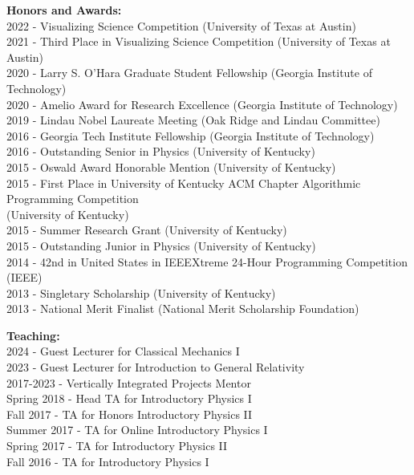 \documentclass[11pt]{article}
\begin{document}
\begin{flushleft}
  \textbf{Honors and Awards:}\\
  2022 - Visualizing Science Competition (University of Texas at Austin)\\
  2021 - Third Place in Visualizing Science Competition (University of Texas at Austin)\\
  2020 - Larry S. O'Hara Graduate Student Fellowship (Georgia Institute of Technology)\\
  2020 - Amelio Award for Research Excellence (Georgia Institute of Technology)\\
  2019 - Lindau Nobel Laureate Meeting (Oak Ridge and Lindau Committee)\\
  2016 - Georgia Tech Institute Fellowship (Georgia Institute of Technology)\\
  2016 - Outstanding Senior in Physics (University of Kentucky)\\
  2015 - Oswald Award Honorable Mention (University of Kentucky)\\
  \vspace{2px}
  2015 - First Place in University of Kentucky ACM Chapter Algorithmic Programming Competition\\ 
  \hspace{29px} (University of Kentucky)\\
  2015 - Summer Research Grant (University of Kentucky)\\
  2015 - Outstanding Junior in Physics (University of Kentucky)\\
  2014 - 42nd in United States in IEEEXtreme 24-Hour Programming Competition (IEEE)\\
  2013 - Singletary Scholarship (University of Kentucky)\\
  2013 - National Merit Finalist (National Merit Scholarship Foundation)\\

\vspace{8px}

  \textbf{Teaching:}\\
  2024 - Guest Lecturer for Classical Mechanics I\\
  2023 - Guest Lecturer for Introduction to General Relativity\\
  2017-2023 - Vertically Integrated Projects Mentor\\
  Spring 2018 - Head TA for Introductory Physics I\\
  Fall 2017 - TA for Honors Introductory Physics II\\
  Summer 2017 - TA for Online Introductory Physics I\\
  Spring 2017 - TA for Introductory Physics II\\
  Fall 2016 - TA for Introductory Physics I\\
  

\end{flushleft}
\end{document}
